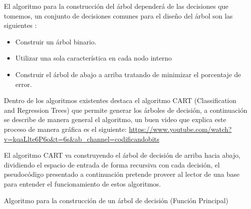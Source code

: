 \documentclass[11pt,fleqn]{book} %
\begin{document}
El algoritmo para la construcción del árbol dependerá de las decisiones que tomemos, un conjunto de decisiones comunes para el diseño del árbol son las siguientes \cite{dtc_survey}:

\begin{itemize}
\item Construir un árbol binario.
\item Utilizar una sola característica en cada nodo interno
\item Construir el árbol de abajo a arriba tratando de minimizar el porcentaje de error. 
\end{itemize}

Dentro de los algoritmos existentes destaca el algoritmo CART (Classification and Regression Trees) que permite generar los árboles de decisión, a continuación se describe de manera general el algoritmo, un buen video que explica este proceso de manera gráfica es el siguiente: \url{https://www.youtube.com/watch?v=kqaLlte6P6o&t=6s&ab_channel=codificandobits}

El algoritmo CART va construyendo el árbol de decisión de arriba hacia abajo, dividiendo el espacio de entrada de forma recursiva con cada decisión, el pseudocódigo presentado a continuación pretende proveer al lector de una base para entender el funcionamiento de estos algoritmos.

\begin{algorithm}
  \DontPrintSemicolon
  
  \;

  \caption{Algoritmo para la construcción de un árbol de decisión (Función Principal)}
\end{algorithm}
\FloatBarrier
\end{document}
